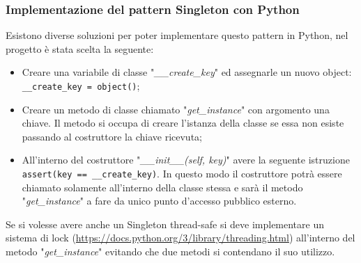 \subsubsection{Implementazione del pattern Singleton con Python}
\label{sec:singleton-python}
Esistono diverse soluzioni per poter implementare questo pattern in Python, nel progetto è stata scelta la seguente:
\begin{itemize}
    \item Creare una variabile di classe "\textit{\_\_create\_key}" ed assegnarle un nuovo object: \texttt{\_\_create\_key = object()};
    \item Creare un metodo di classe chiamato "\textit{get\_instance}" con argomento una chiave. Il metodo si occupa di creare l'istanza della classe se essa non esiste passando al costruttore la chiave ricevuta;
    \item All'interno del costruttore "\textit{\_\_init\_\_(self, key)}" avere la seguente istruzione \texttt{assert(key == \_\_create\_key)}. In questo modo il costruttore potrà essere chiamato solamente all'interno della classe stessa e sarà il metodo "\textit{get\_instance}" a fare da unico punto d'accesso pubblico esterno.
\end{itemize}
Se si volesse avere anche un Singleton thread-safe si deve implementare un sistema di lock (\url{https://docs.python.org/3/library/threading.html}) all'interno del metodo "\textit{get\_instance}" evitando che due metodi si contendano il suo utilizzo.

